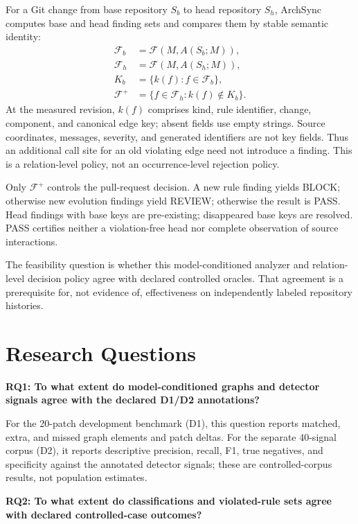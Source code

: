 For a Git change from base repository $S_b$ to head repository $S_h$, ArchSync computes base and head finding sets and compares them by stable semantic identity:
\begin{equation}
\begin{aligned}
  \mathcal{F}_b &= \mathcal{F}(M,A(S_b;M)),\\
  \mathcal{F}_h &= \mathcal{F}(M,A(S_h;M)),\\
  K_b &= \{k(f):f\in\mathcal{F}_b\},\\
  \mathcal{F}^{+} &= \{f\in\mathcal{F}_h:k(f)\notin K_b\}.
\end{aligned}
\end{equation}
At the measured revision, $k(f)$ comprises kind, rule identifier, change, component, and canonical edge key; absent fields use empty strings. Source coordinates, messages, severity, and generated identifiers are not key fields. Thus an additional call site for an old violating edge need not introduce a finding. This is a relation-level policy, not an occurrence-level rejection policy.

Only $\mathcal{F}^{+}$ controls the pull-request decision. A new rule finding yields BLOCK; otherwise new evolution findings yield REVIEW; otherwise the result is PASS. Head findings with base keys are pre-existing; disappeared base keys are resolved. PASS certifies neither a violation-free head nor complete observation of source interactions.

The feasibility question is whether this model-conditioned analyzer and relation-level decision policy agree with declared controlled oracles. That agreement is a prerequisite for, not evidence of, effectiveness on independently labeled repository histories.

\section{Research Questions}

\textbf{RQ1: To what extent do model-conditioned graphs and detector signals agree with the declared D1/D2 annotations?}

For the 20-patch development benchmark (D1), this question reports matched, extra, and missed graph elements and patch deltas. For the separate 40-signal corpus (D2), it reports descriptive precision, recall, F1, true negatives, and specificity against the annotated detector signals; these are controlled-corpus results, not population estimates.

\textbf{RQ2: To what extent do classifications and violated-rule sets agree with declared controlled-case outcomes?}

